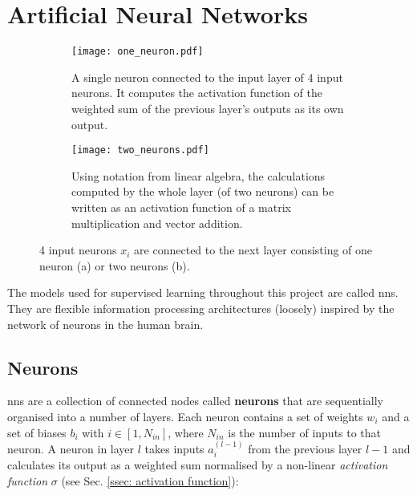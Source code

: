 \section{Artificial Neural Networks \label{sec: neural nets}}

    \begin{figure}[h]
        \centering
        \begin{subfigure}[b]{0.9\textwidth}
            \texttt{[image: one\_neuron.pdf]}
            \caption{A single neuron connected to the input layer of 4 input \glspl{neuron}. It computes the activation function of the weighted sum of the previous layer's outputs as its own output. \label{subfig: neuron}}
        \end{subfigure}
        \hfill
        \begin{subfigure}[b]{0.9\textwidth}
            \texttt{[image: two\_neurons.pdf]}
            \caption{Using notation from linear algebra, the calculations computed by the whole layer (of two \glspl{neuron}) can be written as an activation function of a matrix multiplication and vector addition. \label{subfig: layer}}
        \end{subfigure}
        \caption{4 input \glspl{neuron} $x_i$ are connected to the next layer consisting of one \gls{neuron} (a) or two \glspl{neuron} (b).}
    \end{figure}

    

    The \glspl{model} used for supervised learning throughout this project are called \glspl{nn}. They are flexible information processing architectures (loosely) inspired by the network of \glspl{neuron} in the human brain.
    
    \subsection{Neurons}
        \Glspl{nn} are a collection of connected nodes called \textbf{\glspl{neuron}} that are sequentially organised into a number of layers. Each \gls{neuron} contains a set of weights $w_i$ and a set of biases $b_i$ with $i \in [1, N_{in}]$, where $N_{in}$ is the number of inputs to that \gls{neuron}. A \gls{neuron} in layer $l$ takes inputs $a_i^{(l-1)}$ from the previous layer $l-1$ and calculates its output as a weighted sum normalised by a non-linear \textit{activation function} $\sigma$ (see Sec. \ref{ssec: activation function}):
    
